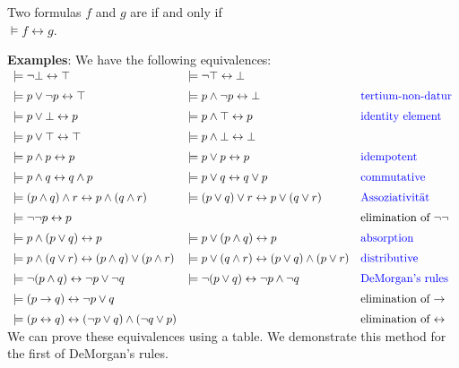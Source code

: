 \begin{Definition}[Equivalent]
  Two formulas $f$ and $g$ are   if and only if  \\[0.2cm]
  \hspace*{1.3cm} $\models f \leftrightarrow g$.   
  \eox
\end{Definition}

\noindent
\textbf{Examples}:  We have the following equivalences: \\[0.3cm]
\hspace*{0.3cm} 
$\begin{array}{lll}
\models \neg \falsum \leftrightarrow \verum & \models \neg \verum \leftrightarrow \falsum &  \\[0.2cm]
 \models p \vee   \neg p \leftrightarrow \verum & \models p \wedge \neg p \leftrightarrow \falsum & \mbox{\blue{tertium-non-datur}} \\[0.2cm]
 \models p \vee   \falsum \leftrightarrow p & \models p \wedge \verum  \leftrightarrow p & \mbox{\blue{identity element}}\\[0.2cm]
 \models p \vee   \verum  \leftrightarrow \verum & \models p \wedge \falsum \leftrightarrow \falsum &  \\[0.2cm]
 \models p \wedge p \leftrightarrow p  & \models p \vee p \leftrightarrow p &  \mbox{\blue{idempotent}}\index{idempotent} \\[0.2cm]
 \models p \wedge q \leftrightarrow q \wedge p & \models p \vee   q \leftrightarrow q \vee p & \mbox{\blue{commutative}}\index{commutative} \\[0.2cm]
 \models (p \wedge q) \wedge r \leftrightarrow p \wedge (q \wedge r) & \models (p \vee   q) \vee r \leftrightarrow p \vee   (q \vee r)  &
 \mbox{\blue{Assoziativität}}\index{associative} \\[0.2cm]
 \models \neg \neg p \leftrightarrow p & & \mbox{elimination of $\neg \neg$} \\[0.2cm]
 \models p \wedge (p \vee q)   \leftrightarrow p & \models p \vee   (p \wedge q) \leftrightarrow p &  \mbox{\blue{absorption}}\index{absorption} \\[0.2cm]
 \models p \wedge (q \vee r)   \leftrightarrow (p \wedge q) \vee   (p \wedge r) & 
 \models p \vee   (q \wedge r) \leftrightarrow (p \vee q)   \wedge (p \vee   r) & \mbox{\blue{distributive}}\index{distributive} \\[0.2cm]
 \models \neg (p \wedge q) \leftrightarrow  \neg p \vee   \neg q &  \models \neg (p \vee   q) \leftrightarrow  \neg p \wedge \neg q &
 \mbox{\blue{DeMorgan's rules}}\index{DeMorgan rules}  \\[0.2cm]
 \models (p \rightarrow q) \leftrightarrow \neg p \vee q & &  \mbox{elimination of $\rightarrow$} \\[0.2cm]
 \models (p \leftrightarrow q) \leftrightarrow (\neg p \vee q) \wedge (\neg q \vee p) & & \mbox{elimination of $\leftrightarrow$}
\end{array}$ \\[0.3cm]
We can prove these equivalences using a table.  We demonstrate this method for the first of DeMorgan's rules.

